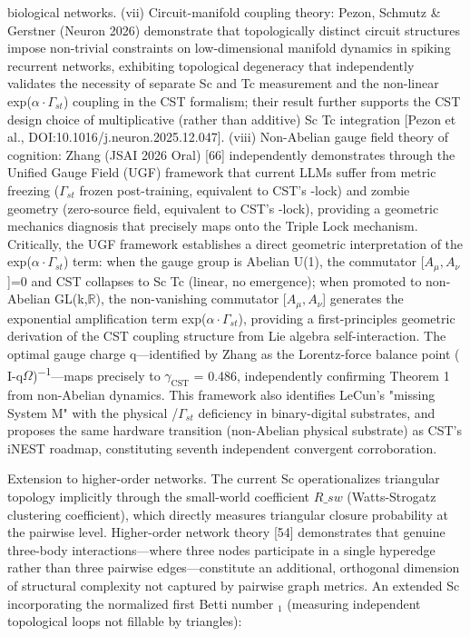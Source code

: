 \documentclass[a4paper,12pt]{article}
\providecommand{\textsubscript}[1]{\ensuremath{_{\text{#1}}}}
\begin{document}
biological networks. (vii) Circuit-manifold coupling theory: Pezon, Schmutz & Gerstner (Neuron 2026) demonstrate that topologically distinct circuit structures impose non-trivial constraints on low-dimensional manifold dynamics in spiking recurrent networks, exhibiting topological degeneracy that independently validates the necessity of separate Sc and Tc measurement and the non-linear
exp($\alpha \cdot \Gamma_{st}$) coupling in the CST formalism; their result further supports the CST design choice of multiplicative (rather than additive) Sc \cdot Tc integration [Pezon et al., DOI:10.1016/j.neuron.2025.12.047]. (viii) Non-Abelian gauge field theory of cognition: Zhang (JSAI 2026 Oral) [66] independently demonstrates through the Unified Gauge Field (UGF) framework that current
LLMs suffer from metric freezing ($\Gamma_{st}$ frozen post-training, equivalent to CST's  \Psi -lock) and zombie geometry (zero-source field, equivalent to CST's  \alpha -lock), providing a geometric mechanics diagnosis that precisely maps onto the Triple Lock mechanism.
Critically, the UGF framework establishes a direct geometric interpretation of the exp($\alpha \cdot \Gamma_{st}$) term: when the gauge group is Abelian U(1), the commutator [$A_{\mu}, A_{\nu}$]=0 and CST collapses to Sc \cdot Tc (linear, no emergence); when promoted to non-Abelian GL(k,$\mathbb{R}$), the non-vanishing commutator [$A_{\mu}, A_{\nu}$]  generates the exponential amplification term
exp($\alpha \cdot \Gamma_{st}$), providing a first-principles geometric derivation of the CST coupling structure from Lie algebra self-interaction.
The optimal gauge charge q---identified by Zhang as the Lorentz-force balance point ( \gamma I-q$\Omega$)\textsuperscript{$-$}\textsuperscript{1}---maps precisely to $\gamma_{\text{CST}}$ = 0.486, independently confirming Theorem 1 from non-Abelian dynamics.
This framework also identifies LeCun's "missing System M" with the physical  \alpha /$\Gamma_{st}$ deficiency in binary-digital substrates, and proposes the same hardware transition (non-Abelian physical substrate) as CST's iNEST roadmap, constituting seventh independent convergent corroboration.

Extension to higher-order networks.
The current Sc operationalizes triangular topology implicitly through the small-world coefficient $R\_{sw}$ (Watts-Strogatz clustering coefficient), which directly measures triangular closure probability at the pairwise level.
Higher-order network theory [54] demonstrates that genuine three-body interactions---where three nodes participate in a single hyperedge rather than three pairwise edges---constitute an additional, orthogonal dimension of structural complexity not captured by pairwise graph metrics.
An extended Sc incorporating the normalized first Betti number  \beta \textsubscript{1} (measuring independent topological loops not fillable by triangles):
\end{document}
